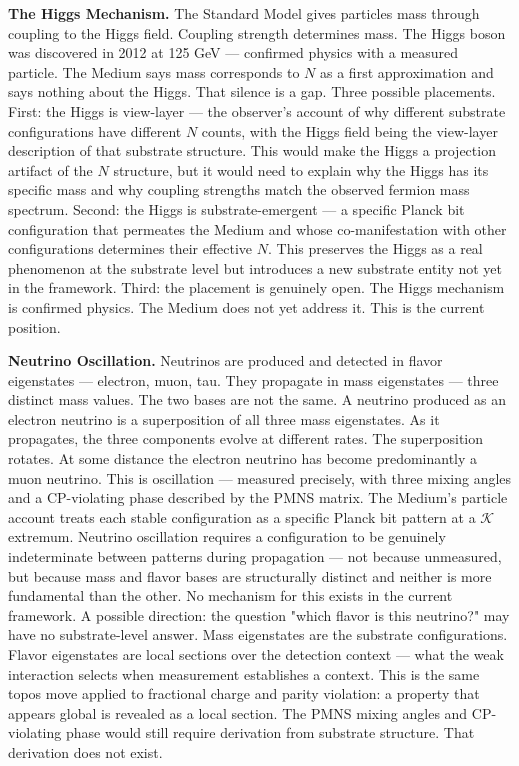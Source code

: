 \documentclass[11pt,letterpaper]{article}
\newcommand{\Kappa}{\mathcal{K}}
\begin{document}
\textbf{The Higgs Mechanism.} The Standard Model gives particles mass through coupling to the Higgs field. Coupling strength determines mass. The Higgs boson was discovered in 2012 at 125 GeV --- confirmed physics with a measured particle. The Medium says mass corresponds to \(N\) as a first approximation and says nothing about the Higgs. That silence is a gap. Three possible placements. First: the Higgs is view-layer --- the observer's account of why different substrate configurations have different \(N\) counts, with the Higgs field being the view-layer description of that substrate structure. This would make the Higgs a projection artifact of the \(N\) structure, but it would need to explain why the Higgs has its specific mass and why coupling strengths match the observed fermion mass spectrum. Second: the Higgs is substrate-emergent --- a specific Planck bit configuration that permeates the Medium and whose co-manifestation with other configurations determines their effective \(N\). This preserves the Higgs as a real phenomenon at the substrate level but introduces a new substrate entity not yet in the framework. Third: the placement is genuinely open. The Higgs mechanism is confirmed physics. The Medium does not yet address it. This is the current position.

\textbf{Neutrino Oscillation.} Neutrinos are produced and detected in flavor eigenstates --- electron, muon, tau. They propagate in mass eigenstates --- three distinct mass values. The two bases are not the same. A neutrino produced as an electron neutrino is a superposition of all three mass eigenstates. As it propagates, the three components evolve at different rates. The superposition rotates. At some distance the electron neutrino has become predominantly a muon neutrino. This is oscillation --- measured precisely, with three mixing angles and a CP-violating phase described by the PMNS matrix. The Medium's particle account treats each stable configuration as a specific Planck bit pattern at a \(\Kappa\) extremum. Neutrino oscillation requires a configuration to be genuinely indeterminate between patterns during propagation --- not because unmeasured, but because mass and flavor bases are structurally distinct and neither is more fundamental than the other. No mechanism for this exists in the current framework. A possible direction: the question "which flavor is this neutrino?" may have no substrate-level answer. Mass eigenstates are the substrate configurations. Flavor eigenstates are local sections over the detection context --- what the weak interaction selects when measurement establishes a context. This is the same topos move applied to fractional charge and parity violation: a property that appears global is revealed as a local section. The PMNS mixing angles and CP-violating phase would still require derivation from substrate structure. That derivation does not exist.
\end{document}
